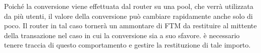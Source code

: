 Poiché la conversione viene effettuata dal router su una pool, che verrà utilizzata da più utenti, il valore della conversione può cambiare rapidamente anche solo di poco. Il router in tal caso tornerà un ammontare di FTM da restituire al mittente della transazione nel caso in cui la conversione sia a suo sfavore. è necessario tenere traccia di questo comportamento e gestire la restituzione di tale importo.


